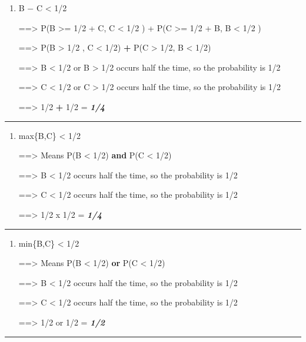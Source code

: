 \documentclass[
]{article}
\begin{document}
\begin{enumerate}
\def\labelenumi{(\alph{enumi})}
\setcounter{enumi}{2}
\item
  \textbar B − C\textbar{} \textless{} 1/2

  ==\textgreater{} P(B \textgreater= 1/2 + C, C \textless{} 1/2 ) + P(C
  \textgreater= 1/2 + B, B \textless{} 1/2 )

  ==\textgreater{} P(B \textgreater{} 1/2 , C \textless{} 1/2)
  \textbf{+} P(C \textgreater{} 1/2, B \textless{} 1/2)

  ==\textgreater{} B \textless{} 1/2 or B \textgreater{} 1/2 occurs half
  the time, so the probability is 1/2

  ==\textgreater{} C \textless{} 1/2 or C \textgreater{} 1/2 occurs half
  the time, so the probability is 1/2

  ==\textgreater{} 1/2 \textbf{+} 1/2 = \textbf{\emph{1/4}}
\end{enumerate}

\begin{center}\rule{0.5\linewidth}{0.5pt}\end{center}

\begin{enumerate}
\def\labelenumi{(\alph{enumi})}
\setcounter{enumi}{3}
\item
  max\{B,C\} \textless{} 1/2

  ==\textgreater{} Means P(B \textless{} 1/2) \textbf{and} P(C
  \textless{} 1/2)

  ==\textgreater{} B \textless{} 1/2 occurs half the time, so the
  probability is 1/2

  ==\textgreater{} C \textless{} 1/2 occurs half the time, so the
  probability is 1/2

  ==\textgreater{} 1/2 x 1/2 = \textbf{\emph{1/4}}
\end{enumerate}

\begin{center}\rule{0.5\linewidth}{0.5pt}\end{center}

\begin{enumerate}
\def\labelenumi{(\alph{enumi})}
\setcounter{enumi}{4}
\item
  min\{B,C\} \textless{} 1/2

  ==\textgreater{} Means P(B \textless{} 1/2) \textbf{or} P(C
  \textless{} 1/2)

  ==\textgreater{} B \textless{} 1/2 occurs half the time, so the
  probability is 1/2

  ==\textgreater{} C \textless{} 1/2 occurs half the time, so the
  probability is 1/2

  ==\textgreater{} 1/2 or 1/2 = \textbf{\emph{1/2}}
\end{enumerate}

\begin{center}\rule{0.5\linewidth}{0.5pt}\end{center}
\end{document}
